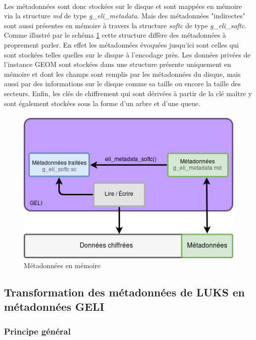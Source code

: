\paragraph{}
Les métadonnées sont donc stockées sur le disque et sont mappées en mémoire via
la structure {\em md} de type {\em g\_eli\_metadata}. Mais des métadonnées 
"indirectes" sont aussi présentes en mémoire à travers la structure {\em softc} 
de type {\em g\_eli\_softc}. Comme illustré par le schéma \ref{fig:softc_eli} 
cette structure diffère des métadonnées à proprement parler. En effet les
métadonnées évoquées jusqu'ici sont celles qui sont stockées telles quelles sur
le disque à l'encodage près. Les données privées de l'instance GEOM sont
stockées dans une structure présente  uniquement en mémoire et dont les champs
sont remplis par les métadonnées du disque, mais aussi par des informations sur
le disque comme sa taille ou encore la taille des secteurs. Enfin, les clés de
chiffrement qui sont dérivées à partir de la clé maître y sont également
stockées sous la forme d'un arbre et d'une queue.

\paragraph{}
\begin{figure}[h]
  \centering
  \includegraphics[width=.6\linewidth]{choix_developpement/utilisation_metadonnee.png}
  \caption{\label{fig:softc_eli}Métadonnées en mémoire}
\end{figure}

\subsection{Transformation des métadonnées de LUKS en métadonnées GELI}
\subsubsection{Principe général}
